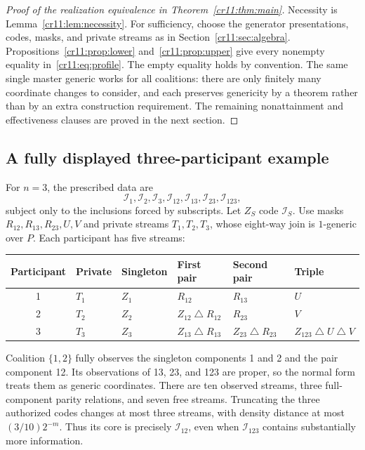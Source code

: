 \documentclass[11pt,letterpaper]{article}
\theoremstyle{plain}
\theoremstyle{definition}
\theoremstyle{remark}
\numberwithin{equation}{section}
\newcommand{\bitsum}{\mathbin{\triangle}}
\newcommand{\I}{\mathcal I}
\begin{document}
\begin{proof}[Proof of the realization equivalence in Theorem~\ref{cr11:thm:main}]
Necessity is Lemma~\ref{cr11:lem:necessity}. For sufficiency, choose the generator
presentations, codes, masks, and private streams as in
Section~\ref{cr11:sec:algebra}. Propositions~\ref{cr11:prop:lower} and~\ref{cr11:prop:upper}
give every nonempty equality in~\eqref{cr11:eq:profile}. The empty equality holds
by convention. The same single master generic works for all coalitions:
there are only finitely many coordinate changes to consider, and each
preserves genericity by a theorem rather than by an extra construction
requirement. The remaining nonattainment and effectiveness clauses are
proved in the next section.
\end{proof}

\subsection{A fully displayed three-participant example}

For $n=3$, the prescribed data are
\[
 \I_1,\I_2,\I_3,\I_{12},\I_{13},\I_{23},\I_{123},
\]
subject only to the inclusions forced by subscripts. Let $Z_S$ code $\I_S$.
Use masks $R_{12},R_{13},R_{23},U,V$ and private streams $T_1,T_2,T_3$,
whose eight-way join is $1$-generic over $P$. Each participant has five
streams:
\begin{center}\small
\begin{tabular}{@{}clllll@{}}
\toprule
Participant & Private & Singleton & First pair & Second pair & Triple\\
\midrule
1 & $T_1$ & $Z_1$ & $R_{12}$ & $R_{13}$ & $U$\\
2 & $T_2$ & $Z_2$ & $Z_{12}\bitsum R_{12}$ & $R_{23}$ & $V$\\
3 & $T_3$ & $Z_3$ & $Z_{13}\bitsum R_{13}$ & $Z_{23}\bitsum R_{23}$ & $Z_{123}\bitsum U\bitsum V$\\
\bottomrule
\end{tabular}
\end{center}

Coalition $\{1,2\}$ fully observes the singleton components 1 and 2 and the
pair component 12. Its observations of 13, 23, and 123 are proper, so the
normal form treats them as generic coordinates. There are ten observed
streams, three full-component parity relations, and seven free streams.
Truncating the three authorized codes changes at most three streams,
with density distance at most $(3/10)2^{-m}$. Thus its core is precisely
$\I_{12}$, even when $\I_{123}$ contains substantially more information.
\end{document}
